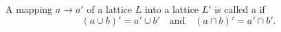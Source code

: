 A mapping $a \rightarrow a'$ of a lattice $L$ into a lattice $L'$ is called a  if
$$(a \cup b)' = a' \cup b' \quad \text{and} \quad (a \cap b)' = a' \cap b'.$$
